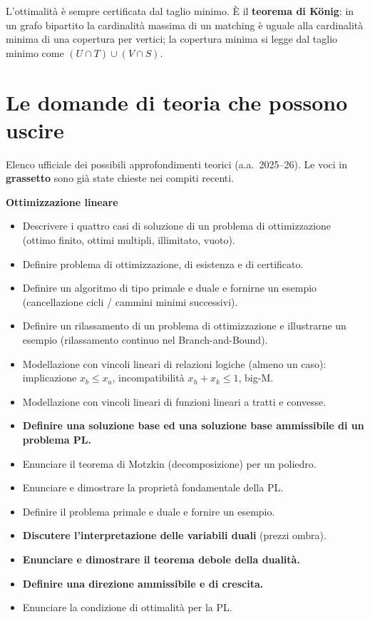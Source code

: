 \documentclass[11pt,a4paper]{article}
\begin{document}
L'ottimalità è sempre certificata dal taglio minimo. È il \textbf{teorema di König}:
in un grafo bipartito la cardinalità massima di un matching è uguale alla
cardinalità minima di una copertura per vertici; la copertura minima si legge dal taglio
minimo come $(U \cap T) \cup (V \cap S)$.

\newpage
\section{Le domande di teoria che possono uscire}

Elenco ufficiale dei possibili approfondimenti teorici (a.a.\ 2025--26).
Le voci in \textbf{grassetto} sono già state chieste nei compiti recenti.

\textbf{Ottimizzazione lineare}
\begin{itemize}[itemsep=0.15em]
\item Descrivere i quattro casi di soluzione di un problema di ottimizzazione
      (ottimo finito, ottimi multipli, illimitato, vuoto).
\item Definire problema di ottimizzazione, di esistenza e di certificato.
\item Definire un algoritmo di tipo primale e duale e fornirne un esempio
      (cancellazione cicli / cammini minimi successivi).
\item Definire un rilassamento di un problema di ottimizzazione e illustrarne un esempio
      (rilassamento continuo nel Branch-and-Bound).
\item Modellazione con vincoli lineari di relazioni logiche (almeno un caso):
      implicazione $x_b \le x_a$, incompatibilità $x_h + x_k \le 1$, big-M.
\item Modellazione con vincoli lineari di funzioni lineari a tratti e convesse.
\item \textbf{Definire una soluzione base ed una soluzione base ammissibile di un problema PL.}
\item Enunciare il teorema di Motzkin (decomposizione) per un poliedro.
\item Enunciare e dimostrare la proprietà fondamentale della PL.
\item Definire il problema primale e duale e fornire un esempio.
\item \textbf{Discutere l'interpretazione delle variabili duali} (prezzi ombra).
\item \textbf{Enunciare e dimostrare il teorema debole della dualità.}
\item \textbf{Definire una direzione ammissibile e di crescita.}
\item Enunciare la condizione di ottimalità per la PL.
\end{itemize}
\end{document}
